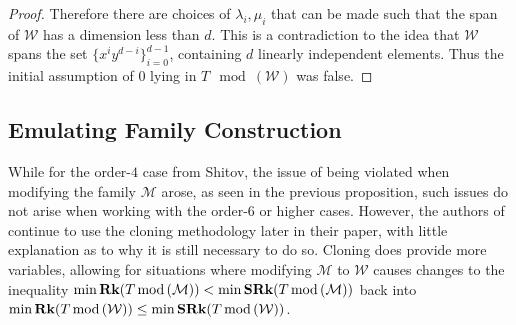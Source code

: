 \documentclass[../Lael_John_MasterThesis_Draft.tex]{subfiles}
\begin{document}
\begin{proof}
    Therefore there are choices of $\lambda_i, \mu_i$ that can be made such that the span of $\mathcal{W}$ has a dimension less than $d$. This is a contradiction to the idea that $\mathcal{W}$ spans the set $\{x^iy^{d-i}\}_{i=0}^{d-1}$, containing $d$ linearly independent elements. Thus the initial assumption of $0$ lying in $T\mod(\mathcal{W})$ was false. 
    

\end{proof}
\subsection{Emulating Family Construction}\label{subsection:emulatingfamily}
While for the order-$4$ case from Shitov, the issue of  being violated when modifying the family $\mathcal{M}$ arose, as seen in the previous proposition, such issues do not arise when working with the order-$6$ or higher cases. However, the authors of \cite{wang_lower_2023} continue to use the cloning methodology later in their paper, with little explanation as to why it is still necessary to do so. Cloning does provide more variables, allowing for situations where modifying $\mathcal{M}$ to $\mathcal{W}$ causes changes to the inequality  $\min \textbf{Rk}(T\text{\,mod\,}(\mathcal{M})) < \min \textbf{SRk}(T\text{\,mod\,}(\mathcal{M}))$ back into $\min \textbf{Rk}(T\text{\,mod\,}(\mathcal{W})) \leq \min \textbf{SRk}(T\text{\,mod\,}(\mathcal{W}))$.  

\end{document}

